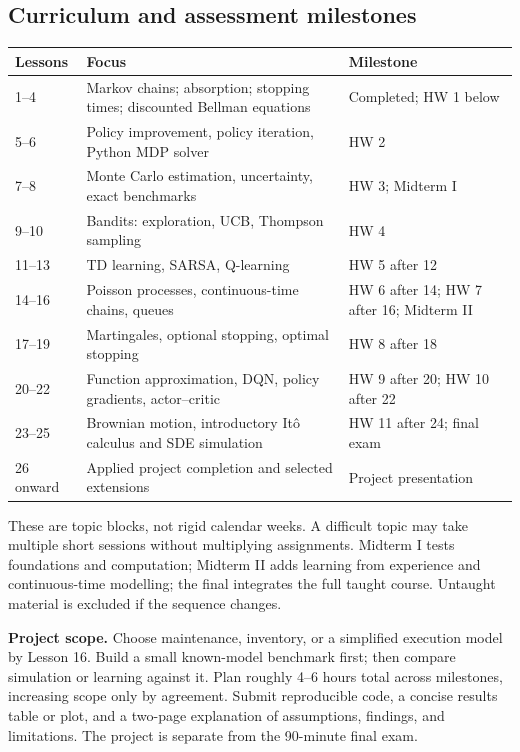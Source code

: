 \documentclass[11pt]{article}
\theoremstyle{remark}\newtheorem{remark}[definition]{Remark}
\begin{document}
\subsection*{Curriculum and assessment milestones}
\begin{center}\small
\begin{tabular}{@{}p{0.62in}p{3.3in}p{1.05in}@{}}\toprule
Lessons & Focus & Milestone\\\midrule
1--4 & Markov chains; absorption; stopping times; discounted Bellman equations & Completed; HW 1 below\\
5--6 & Policy improvement, policy iteration, Python MDP solver & HW 2\\
7--8 & Monte Carlo estimation, uncertainty, exact benchmarks & HW 3; Midterm I\\
9--10 & Bandits: exploration, UCB, Thompson sampling & HW 4\\
11--13 & TD learning, SARSA, Q-learning & HW 5 after 12\\
14--16 & Poisson processes, continuous-time chains, queues & HW 6 after 14; HW 7 after 16; Midterm II\\
17--19 & Martingales, optional stopping, optimal stopping & HW 8 after 18\\
20--22 & Function approximation, DQN, policy gradients, actor--critic & HW 9 after 20; HW 10 after 22\\
23--25 & Brownian motion, introductory It\^o calculus and SDE simulation & HW 11 after 24; final exam\\
26 onward & Applied project completion and selected extensions & Project presentation\\\bottomrule
\end{tabular}\end{center}
These are topic blocks, not rigid calendar weeks. A difficult topic may take multiple short sessions without multiplying assignments. Midterm I tests foundations and computation; Midterm II adds learning from experience and continuous-time modelling; the final integrates the full taught course. Untaught material is excluded if the sequence changes.

\textbf{Project scope.} Choose maintenance, inventory, or a simplified execution model by Lesson 16. Build a small known-model benchmark first; then compare simulation or learning against it. Plan roughly 4--6 hours total across milestones, increasing scope only by agreement. Submit reproducible code, a concise results table or plot, and a two-page explanation of assumptions, findings, and limitations. The project is separate from the 90-minute final exam.
\end{document}
